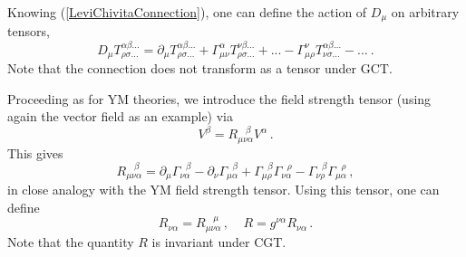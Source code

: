 \documentclass[11pt,a4paper]{article}
\begin{document}
Knowing (\ref{LeviChivitaConnection}), one can define the action of $D_\mu$ on arbitrary tensors,
\begin{equation}
D_\mu T^{\alpha\beta...}_{\rho\sigma...}=\partial_\mu T^{\alpha\beta...}_{\rho\sigma...}+\Gamma_{\mu\nu}^\alpha T^{\nu\beta...}_{\rho\sigma...}+...-\Gamma_{\mu\rho}^{\nu}T^{\alpha\beta...}_{\nu\sigma...}-... ~ .
\end{equation}
Note that the connection does not transform as a tensor under GCT.

Proceeding as for YM theories, we introduce the field strength tensor (using again the vector field as an example) via
\begin{equation}
[D_\mu, D_\nu]V^\beta=R_{\mu\nu\alpha}^{~~~~\beta} V^\alpha \,.
\end{equation}
This gives
\begin{equation}
R_{\mu\nu\alpha}^{~~~~\beta}=\partial_\mu\Gamma_{\nu\alpha}^{~~~\beta}-\partial_\nu\Gamma_{\mu\alpha}^{~~~\beta}
+\Gamma_{\mu\rho}^{~~~\beta}\Gamma^{~~~\rho}_{\nu\alpha}-\Gamma_{\nu\rho}^{~~~\beta}\Gamma_{\mu\alpha}^{~~~\rho} \,,
\end{equation}
in close analogy with the YM field strength tensor. Using this tensor, one can define
\begin{equation}
R_{\nu\alpha}=R_{\mu\nu\alpha}^{~~~~\mu} \,,~~~~~ R=g^{\nu\alpha}R_{\nu\alpha}\,.
\end{equation}
Note that the quantity $R$ is invariant under CGT.
\end{document}
